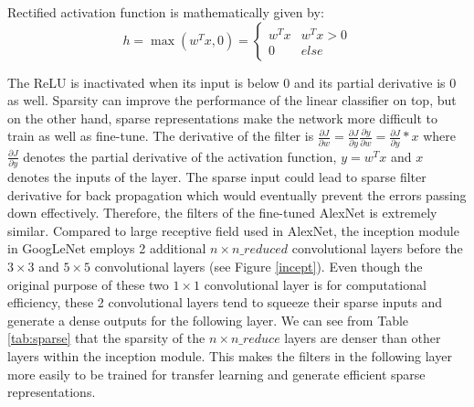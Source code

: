 Rectified activation function is mathematically given by:
      \begin{equation}\label{relu}
        h = \max ({w^T}x,0) = \left\{ {\begin{array}{*{20}{c}}
{{w^T}x}&{{w^T}x > 0}\\
0&{else}
\end{array}} \right.
      \end{equation}

    The ReLU is inactivated when its input is below 0 and its partial derivative is 0 as well. Sparsity can improve the performance of the linear classifier on top, but on the other hand, sparse representations make the network more difficult to train as well as fine-tune. The derivative of the filter is $\frac{{\partial J}}{{\partial w}} = \frac{{\partial J}}{{\partial y}}\frac{{\partial y}}{{\partial w}} = \frac{{\partial J}}{{\partial y}}*x$ where $\frac{{\partial J}}{{\partial y}}$ denotes the partial derivative of the activation function, $y=w^Tx$ and $x$ denotes the inputs of the layer. The sparse input could lead to sparse filter derivative for back propagation which would eventually prevent the errors passing down effectively. Therefore, the filters of the fine-tuned AlexNet is extremely similar. Compared to large receptive field used in AlexNet, the inception module in GoogLeNet employs 2 additional $n\times n\_reduced$ convolutional layers before the $3\times 3$ and $5\times 5$ convolutional layers (see Figure \ref{incept}). Even though the original purpose of these two $1\times 1$ convolutional layer is for computational efficiency, these 2 convolutional layers tend to squeeze their sparse inputs and generate a dense outputs for the following layer. We can see from Table \ref{tab:sparse} that the sparsity of the $n\times n\_reduce$ layers are denser than other layers within the inception module. This makes the filters in the following layer more easily to be trained for transfer learning and generate efficient sparse representations.


